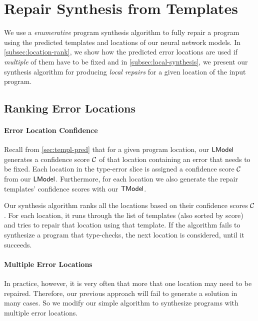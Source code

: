 \section{Repair Synthesis from Templates}
\label{sec:synthesis}
We use a \emph{enumerative} program synthesis algorithm to fully repair a
program using the predicted templates and locations of our neural network
models. In \autoref{subsec:location-rank}, we show how the predicted error
locations are used if \emph{multiple} of them have to be fixed and in
\autoref{subsec:local-synthesis}, we present our synthesis algorithm for
producing \emph{local repairs} for a given location of the input program.

\subsection{Ranking Error Locations}
\label{subsec:location-rank}

\paragraph{Error Location Confidence}
Recall from \autoref{sec:templ-pred} that for a given program location, our
$\mathsf{LModel}$ generates a confidence score $\mathcal{C}$ of that location containing an
error that needs to be fixed. Each location in the type-error slice is assigned
a confidence score $\mathcal{C}$ from our $\mathsf{LModel}$. Furthermore, for each location we
also generate the repair templates' confidence scores with our $\mathsf{TModel}$.

Our synthesis algorithm ranks all the locations based on their
confidence scores $\mathcal{C}$. For each location, it runs through the list
of templates (also sorted by score) and tries to repair that location using that
template. If the algorithm fails to synthesize a
program that type-checks, the next
location is considered, until it succeeds.

\paragraph{Multiple Error Locations}
In practice, however, it is very often that more that one location may need to
be repaired. Therefore, our previous approach will fail to generate a solution
in many cases. So we modify our simple algorithm to synthesize programs with
multiple error locations.

